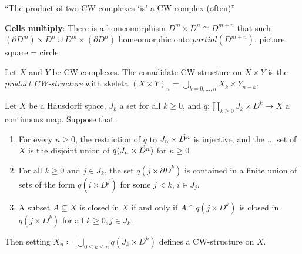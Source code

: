 \documentclass{TemplateLecture}
\begin{document}
\enquote{The product of two CW-complexes \enquote{is} a CW-complex (often)}

\textbf{Cells multiply}: There is a homeomorphism \(D^m \times D^n \cong D^{m + n}\) that such \((\partial D^m) \times D^n \cup D^m \times (\partial D^n)\) homeomorphic onto \(partial(D^{m+n})\). picture square = circle

Let \(X\) and \(Y\) be CW-complexes. The conadidate CW-structure on \(X\times Y\) is the \emph{product CW-structure} with skeleta \((X \times Y)_n = \bigcup_{k = 0, \dots, n} X_k \times Y_{n-k}\).

\begin{proposition}
    Let \(X\) be a Hausdorff space, \(J_k\) a set for all \(k \geq 0\), and \(q\colon \coprod_{k \geq 0} J_k \times D^k \to X\) a continuous map. Suppose that:
    \begin{enumerate}
        \item For every \(n \geq 0\), the restriction of \(q\) to \(J_n \times \mathring{D^n}\) is injective, and the ... set of \(X\) is the disjoint union of \(q(J_n\times \mathring{D^n})\) for \(n \geq 0\)
        \item For all \(k \geq 0\) and \(j \in J_k\), the set \(q(j\times \partial D^k)\) is contained in a finite union of sets of the form \(q(i \times D^j)\) for some \(j < k\), \(i \in J_j\).
        \item A subset \(A \subseteq X\) is closed in \(X\) if and only if \(A \cap q(j\times D^k)\) is closed in \(q(j \times D^k)\) for all \(k \geq 0, j \in J_k\).
    \end{enumerate}
    Then setting \(X_n \coloneq  \bigcup_{0 \leq k \leq n} q(J_k \times D^k)\) defines a CW-structure on \(X\).
\end{proposition}
\end{document}

